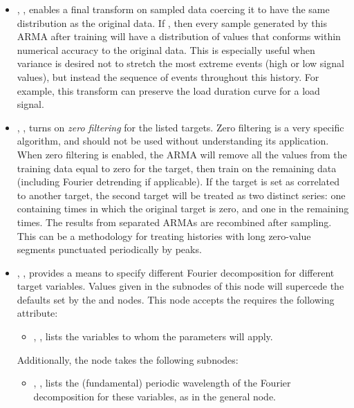 \begin{itemize}
  \item {}, , enables a final transform on sampled
    data coercing it to have the same distribution as the original data. If , then every
    sample generated by this ARMA after training will have a distribution of values that conforms within
    numerical accuracy to the original data. This is especially useful when variance is desired not to stretch
    the most extreme events (high or low signal values), but instead the sequence of events throughout this
    history. For example, this transform can preserve the load duration curve for a load signal.
  \item {}, , turns on \emph{zero filtering}
    for the listed targets. Zero filtering is a very specific algorithm, and should not be used without
    understanding its application.  When zero filtering is enabled, the ARMA will remove all the values from
    the training data equal to zero for the target, then train on the remaining data (including Fourier detrending
    if applicable). If the target is set as correlated to another target, the second target will be treated as
    two distinct series: one containing times in which the original target is zero, and one in the remaining
    times. The results from separated ARMAs are recombined after sampling. This can be a methodology for
    treating histories with long zero-value segments punctuated periodically by peaks.
  \item {}, , provides a means to specify different Fourier
    decomposition for different target variables.  Values given in the subnodes of this node will supercede
    the defaults set by the   and  nodes.  This node accepts the
    requires the following attribute:
    \begin{itemize}
      \item {}, , lists the variables to whom
        the  parameters will apply.
    \end{itemize}
    Additionally, the  node takes the following subnodes:
    \begin{itemize}
      \item {}, , lists the (fundamental)
        periodic wavelength of the Fourier decomposition for these variables, as in the  general node.
    \end{itemize}
    \romClusterOption
\end{itemize}


